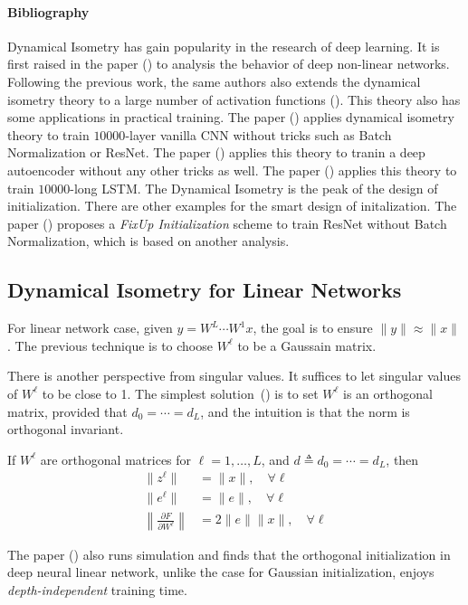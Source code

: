 \paragraph{Bibliography}
Dynamical Isometry has gain popularity in the research of deep learning.
It is first raised in the paper (\cite{DBLP}) to analysis the behavior of deep non-linear networks.
Following the previous work, the same authors also extends the dynamical isometry theory to a large number of activation functions (\cite{Pennington2018TheEO}).
This theory also has some applications in practical training. 
The paper (\cite{pmlr-v80-xiao18a}) applies dynamical isometry theory to train $10000$-layer vanilla CNN without tricks such as Batch Normalization or ResNet.
The paper (\cite{li2018on}) applies this theory to tranin a deep autoencoder without any other tricks as well.
The paper (\cite{08987}) applies this theory to train $10000$-long LSTM.
The Dynamical Isometry is the peak of the design of initialization. There are other examples for the smart design of initalization.
The paper (\cite{zhang2018residual}) proposes a \emph{FixUp Initialization} scheme to train ResNet without Batch Normalization, which is based on another analysis.

\subsection{Dynamical Isometry for Linear Networks}
For linear network case, given $y=W^L\cdots W^1x$, the goal is to ensure $\|y\|\approx\|x\|$.
The previous technique is to choose $W^{\ell}$ to be  a Gaussain matrix.

There is another perspective from singular values. It suffices to let singular values of $W^{\ell}$ to be close to 1.
The simplest solution~(\cite{Saxe14exactsolutions}) is to set $W^{\ell}$ is an orthogonal matrix, provided that $d_0=\cdots=d_L$, and the intuition is that the norm is orthogonal invariant.
\begin{proposition}
If $W^{\ell}$ are orthogonal matrices for $\ell=1,\dots,L$, and $d\triangleq d_0=\cdots=d_L$, then
\begin{align*}
\|z^{\ell}\|&=\|x\|,\quad\forall \ell\\
\|e^{\ell}\|&=\|e\|,\quad\forall \ell\\
\left\|\frac{\partial F}{\partial W^{\ell}}\right\|&=2\|e\|\|x\|,\quad\forall \ell
\end{align*}
\end{proposition}
The paper (\cite{Saxe14exactsolutions}) also runs simulation and finds that the orthogonal initialization in deep neural linear network, unlike the case for Gaussian initialization, enjoys \emph{depth-independent} training time.

